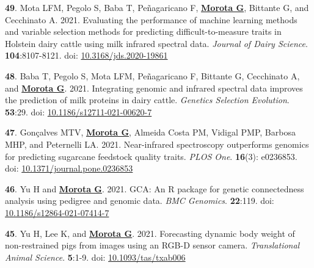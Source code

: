 \documentclass[margin,line,10pt]{res}
\newenvironment{list1}{
  \begin{list}{\ding{113}}{%
      \setlength{\itemsep}{0in}
      \setlength{\parsep}{0in} \setlength{\parskip}{0in}
      \setlength{\topsep}{0in} \setlength{\partopsep}{0in} 
      \setlength{\leftmargin}{0.17in}}}{\end{list}}
\begin{document}
\begin{resume}
\begin{list1}
\item [{\bf 49}.] Mota LFM, Pegolo S, Baba T, Pe\~{n}agaricano F, \textbf{\underline{Morota G}}, Bittante G, and Cecchinato A. 2021. Evaluating the performance of machine learning methods and variable selection methods for predicting difficult-to-measure traits in Holstein dairy cattle using milk infrared spectral data. \emph{Journal of Dairy Science}. \textbf{104}:8107-8121. doi: \textcolor{blue}{\href{https://doi.org/10.3168/jds.2020-19861}{10.3168/jds.2020-19861}}

    \vspace{0.5cm}

\item [{\bf 48}.] Baba T, Pegolo S, Mota LFM, Pe\~{n}agaricano F, Bittante G, Cecchinato A, and \textbf{\underline{Morota G}}. 2021. Integrating genomic and infrared spectral data improves the prediction of milk proteins in dairy cattle. \emph{Genetics Selection Evolution}. \textbf{53}:29. doi: \textcolor{blue}{\href{https://doi.org/10.1186/s12711-021-00620-7}{10.1186/s12711-021-00620-7}}
  
  \vspace{0.5cm}
  
\item [{\bf 47}.] Gon\c{c}alves MTV, \textbf{\underline{Morota G}}, Almeida Costa PM, Vidigal PMP, Barbosa MHP, and Peternelli LA. 2021. Near-infrared spectroscopy outperforms genomics for predicting sugarcane feedstock quality traits.  \emph{PLOS One}. \textbf{16}(3): e0236853. doi: \textcolor{blue}{\href{https://doi.org/10.1371/journal.pone.0236853}{10.1371/journal.pone.0236853}}

  \vspace{0.5cm}

  \item  [{\bf 46}.] Yu H and \textbf{\underline{Morota G}}. 2021. GCA: An R package for genetic connectedness analysis using pedigree and genomic data. \emph{BMC Genomics}. \textbf{22}:119.  doi: \textcolor{blue}{\href{https://doi.org/10.1186/s12864-021-07414-7}{10.1186/s12864-021-07414-7}}

  \vspace{0.5cm}

  
\item [{\bf 45}.] Yu H, Lee K, and \textbf{\underline{Morota G}}. 2021. Forecasting dynamic body weight of non-restrained pigs from images using an RGB-D sensor camera. \emph{Translational Animal Science}. \textbf{5}:1-9. doi: \textcolor{blue}{\href{https://doi.org/10.1093/tas/txab006}{10.1093/tas/txab006}} 


\end{list1}
\end{resume}
\end{document}
